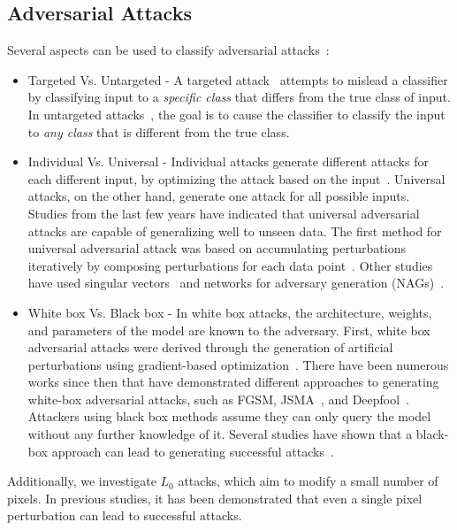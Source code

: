 \documentclass[11pt]{article}
\begin{document}
\subsection{Adversarial Attacks}
Several aspects can be used to classify adversarial attacks~\cite{taxonomy}:
\begin{itemize}
    \item Targeted Vs. Untargeted - A targeted attack~\cite{papernot2015limitations} attempts to mislead a classifier by classifying input to a \textit{specific class} that differs from the true class of input.
    In untargeted attacks~\cite{ref7}, the goal is to cause the classifier to classify the input to \textit{any class} that is different from the true class.
    \item Individual Vs. Universal - Individual attacks generate different attacks for each different input, by optimizing the attack based on the input~\cite{ref7,papernot2015limitations,moosavidezfooli2016deepfool}.
    Universal attacks, on the other hand, generate one attack for all possible inputs.
    Studies from the last few years have indicated that universal adversarial attacks are capable of generalizing well to unseen data.
    The first method for universal adversarial attack was based on accumulating perturbations iteratively by composing perturbations for each data point~\cite{moosavidezfooli2017universal}.
    Other studies have used singular vectors~\cite{khrulkov2017art} and networks for adversary generation (NAGs)~\cite{mopuri2018nag}.
    \item White box Vs. Black box - In white box attacks, the architecture, weights, and parameters of the model are known to the adversary.
    First, white box adversarial attacks were derived through the generation of artificial perturbations using gradient-based optimization~\cite{szegedy2014intriguing}.
    There have been numerous works since then that have demonstrated different approaches to generating white-box adversarial attacks, such as FGSM\cite{ref7}, JSMA~\cite{papernot2015limitations}, and Deepfool~\cite{moosavidezfooli2016deepfool}.
    Attackers using black box methods assume they can only query the model without any further knowledge of it.
    Several studies have shown that a black-box approach can lead to generating successful attacks~\cite{BlackBox1, BlackBox2, BlackBox3, BlackBox4}.
\end{itemize}

Additionally, we investigate $L_0$ attacks, which aim to modify a small number of pixels.
In previous studies, it has been demonstrated that even a single pixel perturbation can lead to successful attacks\cite{OnePixelAttack, alatalo2021chromatic, vargas2019understanding}.
\end{document}
